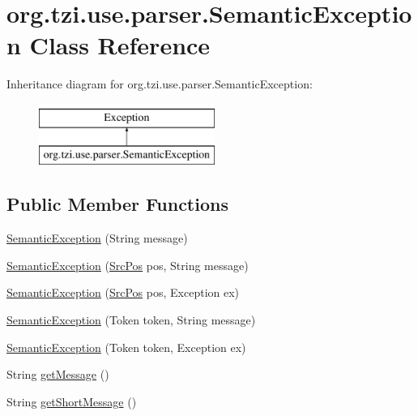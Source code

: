 \hypertarget{classorg_1_1tzi_1_1use_1_1parser_1_1_semantic_exception}{\section{org.\-tzi.\-use.\-parser.\-Semantic\-Exception Class Reference}
\label{classorg_1_1tzi_1_1use_1_1parser_1_1_semantic_exception}
}
Inheritance diagram for org.\-tzi.\-use.\-parser.\-Semantic\-Exception\-:\begin{figure}[H]
\begin{center}
\leavevmode
\includegraphics[height=2.000000cm]{classorg_1_1tzi_1_1use_1_1parser_1_1_semantic_exception}
\end{center}
\end{figure}
\subsection*{Public Member Functions}
\begin{DoxyCompactItemize}
\item 
\hyperlink{classorg_1_1tzi_1_1use_1_1parser_1_1_semantic_exception_ad3fcae8835eb962a42ea7c0eed3ae046}{Semantic\-Exception} (String message)
\item 
\hyperlink{classorg_1_1tzi_1_1use_1_1parser_1_1_semantic_exception_ac882d7d2e841f4769a967096f360fcb8}{Semantic\-Exception} (\hyperlink{classorg_1_1tzi_1_1use_1_1parser_1_1_src_pos}{Src\-Pos} pos, String message)
\item 
\hyperlink{classorg_1_1tzi_1_1use_1_1parser_1_1_semantic_exception_a3400875f09f50689ba93311e3d3d095d}{Semantic\-Exception} (\hyperlink{classorg_1_1tzi_1_1use_1_1parser_1_1_src_pos}{Src\-Pos} pos, Exception ex)
\item 
\hyperlink{classorg_1_1tzi_1_1use_1_1parser_1_1_semantic_exception_ad022d565e4bdb6c8b5d1973e3e392498}{Semantic\-Exception} (Token token, String message)
\item 
\hyperlink{classorg_1_1tzi_1_1use_1_1parser_1_1_semantic_exception_a943859b2cd4239356939860af7ef1659}{Semantic\-Exception} (Token token, Exception ex)
\item 
String \hyperlink{classorg_1_1tzi_1_1use_1_1parser_1_1_semantic_exception_a5abbd244eba918f78459c27bec479bee}{get\-Message} ()
\item 
String \hyperlink{classorg_1_1tzi_1_1use_1_1parser_1_1_semantic_exception_a51e835770ac11cdaebae2e5b94d6130a}{get\-Short\-Message} ()
\end{DoxyCompactItemize}


